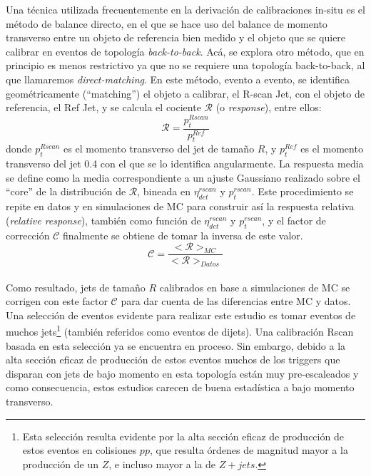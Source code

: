Una técnica utilizada frecuentemente en la derivación de calibraciones in-situ es el método de balance directo, en el que se hace uso del balance de momento transverso entre un objeto de referencia bien medido y el objeto que se quiere calibrar en eventos de topología \textit{back-to-back}. Acá, se explora otro método, que en principio es menos restrictivo ya que no se requiere una topología back-to-back, al que llamaremos \textit{direct-matching}. En este método, evento a evento, se identifica geométricamente (``matching'') el objeto a calibrar, el R-scan Jet, con el objeto de referencia, el Ref Jet, y se calcula el cociente $\mathcal{R}$ (o \textit{response}), entre ellos: 
$$ \mathcal{R}=\frac{p_t^{Rscan}}{p_t^{Ref}} $$ 
\noindent donde $p_t^{Rscan}$ es el momento transverso del jet de tamaño $R$, y $p_t^{Ref}$ es el momento transverso del jet 0.4 con el que se lo identifica angularmente. La respuesta media se define como la media correspondiente a un ajuste Gaussiano realizado sobre el ``core'' de la distribución de $\mathcal{R}$, bineada en $\eta_{det}^{rscan}$ y $p_t^{rscan}$. Este procedimiento se repite en datos y en simulaciones de MC para construir así la respuesta relativa (\textit{relative response}), también como función de $\eta_{det}^{rscan}$ y $p_t^{rscan}$, y el factor de corrección $\mathcal{C}$ finalmente se obtiene de tomar la inversa de este valor.
$$ \mathcal{C}= \frac{<\mathcal{R}>_{MC}}{<\mathcal{R}>_{Datos}}$$\\
\noindent Como resultado, jets de tamaño $R$ calibrados en base a simulaciones de MC se corrigen con este factor $\mathcal{C}$ para dar cuenta de las diferencias entre MC y datos.\\


Una selección de eventos evidente para realizar este estudio es tomar eventos de muchos jets\footnote{Esta selección resulta evidente por la alta sección eficaz de producción de estos eventos en colisiones $pp$, que resulta órdenes de magnitud mayor a la producción de un $Z$, e incluso mayor a la de $Z+jets$.} (también referidos como eventos de dijets). Una calibración Rscan basada en esta selección ya se encuentra en proceso. Sin embargo, debido a la alta sección eficaz de producción de estos eventos muchos de los triggers que disparan con jets de bajo momento en esta topología están muy pre-escaleados y como consecuencia, estos estudios carecen de buena estadística a bajo momento transverso.

